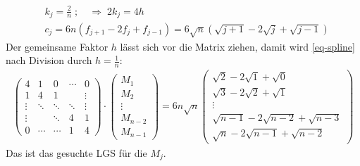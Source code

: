 \begin{align*}
& k_j = \frac{2}{n}\; ; \quad \Rightarrow \; 2 k_j = 4 h\\
& c_j = 6 n \left(f_{j+1} - 2 f_j+ f_{j-1}\right) = 6 \sqrt{n} \left(\sqrt{j+1} - 2 \sqrt{j} + \sqrt{j-1}  \right)
\end{align*}
Der gemeinsame Faktor $h$ lässt sich vor die Matrix ziehen, damit wird \eqref{eq-spline}
nach Division durch $h = \frac{1}{n}$:
\begin{align*}
\begin{pmatrix}
   4 &1 & 0 &\cdots&0\\
   1 &4 &1 & & \vdots\\
  \vdots & \ddots &\ddots&\ddots&\vdots\\
   \vdots & &\ddots&4 &1\\
  0 & \cdots &\cdots& 1&4
\end{pmatrix} \cdot
  \begin{pmatrix}M_1\\M_2 \\ \vdots \\M_{n-2} \\M_{n-1}\end{pmatrix} =
  6 n \sqrt{n}
  \begin{pmatrix}  \sqrt{2} -2\sqrt{1} + \sqrt{0}\\
    \sqrt{3  } - 2\sqrt{2  } + \sqrt{1  } \\ \vdots \\
    \sqrt{n-1} - 2\sqrt{n-2} + \sqrt{n-3} \\
    \sqrt{n  } - 2\sqrt{n-1} + \sqrt{n-2}
  \end{pmatrix}
\end{align*}
Das ist das gesuchte LGS für die $M_j$.
